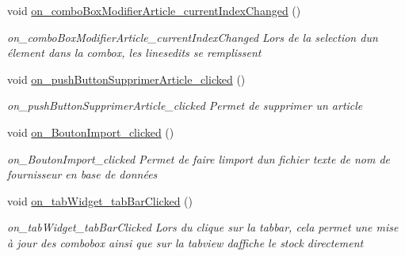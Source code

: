 \begin{DoxyCompactItemize}
void \mbox{\hyperlink{class_main_window_a9cd255f49dc0d52a8683d87d7c92ab0e}{on\+\_\+combo\+Box\+Modifier\+Article\+\_\+current\+Index\+Changed}} ()
\begin{DoxyCompactList}\small\item\em on\+\_\+combo\+Box\+Modifier\+Article\+\_\+current\+Index\+Changed Lors de la selection d\textquotesingle{}un élement dans la combox, les linesedits se remplissent \end{DoxyCompactList}\item 
\mbox{\label{class_main_window_aee34ae888d6ec7e30d347a4e3a251486}} 
void \mbox{\hyperlink{class_main_window_aee34ae888d6ec7e30d347a4e3a251486}{on\+\_\+push\+Button\+Supprimer\+Article\+\_\+clicked}} ()
\begin{DoxyCompactList}\small\item\em on\+\_\+push\+Button\+Supprimer\+Article\+\_\+clicked Permet de supprimer un article \end{DoxyCompactList}\item 
\mbox{\label{class_main_window_af9d4ef882d3b73f923aa837bc90382bd}} 
void \mbox{\hyperlink{class_main_window_af9d4ef882d3b73f923aa837bc90382bd}{on\+\_\+\+Bouton\+Import\+\_\+clicked}} ()
\begin{DoxyCompactList}\small\item\em on\+\_\+\+Bouton\+Import\+\_\+clicked Permet de faire l\textquotesingle{}import d\textquotesingle{}un fichier texte de nom de fournisseur en base de données \end{DoxyCompactList}\item 
\mbox{\label{class_main_window_af00de5382b2aa1dc7e726d83235750f7}} 
void \mbox{\hyperlink{class_main_window_af00de5382b2aa1dc7e726d83235750f7}{on\+\_\+tab\+Widget\+\_\+tab\+Bar\+Clicked}} ()
\begin{DoxyCompactList}\small\item\em on\+\_\+tab\+Widget\+\_\+tab\+Bar\+Clicked Lors du clique sur la tabbar, cela permet une mise à jour des combobox ainsi que sur la tabview d\textquotesingle{}affiche le stock directement \end{DoxyCompactList}\end{DoxyCompactItemize}
